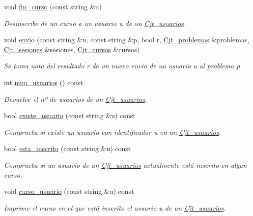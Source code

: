 \begin{DoxyCompactItemize}
void \mbox{\hyperlink{class_cjt__usuarios_a7acb700ca2630c820cbc4d639d8c42de}{fin\+\_\+curso}} (const string \&u)
\begin{DoxyCompactList}\small\item\em Desinscribe de un curso a un usuario u de un \mbox{\hyperlink{class_cjt__usuarios}{Cjt\+\_\+usuarios}}. \end{DoxyCompactList}\item 
void \mbox{\hyperlink{class_cjt__usuarios_ac4e3616bd8af5d118d4039d203805e76}{envio}} (const string \&u, const string \&p, bool r, \mbox{\hyperlink{class_cjt__problemas}{Cjt\+\_\+problemas}} \&problemas, \mbox{\hyperlink{class_cjt__sesiones}{Cjt\+\_\+sesiones}} \&sesiones, \mbox{\hyperlink{class_cjt__cursos}{Cjt\+\_\+cursos}} \&cursos)
\begin{DoxyCompactList}\small\item\em Se toma nota del resultado r de un nuevo envío de un usuario u al problema p. \end{DoxyCompactList}\item 
int \mbox{\hyperlink{class_cjt__usuarios_ab4351f7ee85af8de0f7387fc55d29755}{num\+\_\+usuarios}} () const
\begin{DoxyCompactList}\small\item\em Devuelve el nº de usuarios de un \mbox{\hyperlink{class_cjt__usuarios}{Cjt\+\_\+usuarios}}. \end{DoxyCompactList}\item 
bool \mbox{\hyperlink{class_cjt__usuarios_a97fcd561ffe0aa16a9e59e56bc4ff41c}{existe\+\_\+usuario}} (const string \&u) const
\begin{DoxyCompactList}\small\item\em Comprueba si existe un usuario con identificador u en un \mbox{\hyperlink{class_cjt__usuarios}{Cjt\+\_\+usuarios}}. \end{DoxyCompactList}\item 
bool \mbox{\hyperlink{class_cjt__usuarios_a514664eb81d17248016bfb782b466584}{esta\+\_\+inscrito}} (const string \&u) const
\begin{DoxyCompactList}\small\item\em Comprueba si un usuario de un \mbox{\hyperlink{class_cjt__usuarios}{Cjt\+\_\+usuarios}} actualmente está inscrito en algun curso. \end{DoxyCompactList}\item 
void \mbox{\hyperlink{class_cjt__usuarios_a0a29517de316ac00a23f26df00ef779b}{curso\+\_\+usuario}} (const string \&u) const
\begin{DoxyCompactList}\small\item\em Imprime el curso en el que está inscrito el usuario u de un \mbox{\hyperlink{class_cjt__usuarios}{Cjt\+\_\+usuarios}}. \end{DoxyCompactList}\item 

\end{DoxyCompactItemize}
